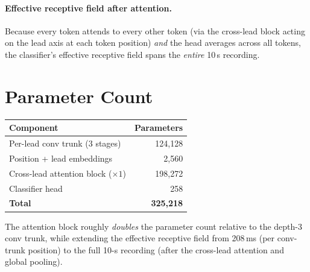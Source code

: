 \documentclass[11pt]{article}
\begin{document}
\paragraph{Effective receptive field after attention.}
Because every token attends to every other token (via the cross-lead block
acting on the lead axis at each token position) \emph{and} the head averages
across all tokens, the classifier's effective receptive field spans the
\emph{entire} 10\,s recording.

\section{Parameter Count}

\begin{center}
\begin{tabular}{lr}
\toprule
Component & Parameters \\
\midrule
Per-lead conv trunk (3 stages)              & 124{,}128 \\
Position + lead embeddings                  & 2{,}560 \\
Cross-lead attention block ($\times 1$)     & 198{,}272 \\
Classifier head                             & 258 \\
\midrule
\textbf{Total}                              & \textbf{325{,}218} \\
\bottomrule
\end{tabular}
\end{center}

The attention block roughly \emph{doubles} the parameter count relative to the
depth-3 conv trunk, while extending the effective receptive field from 208\,ms
(per conv-trunk position) to the full 10-s recording (after the cross-lead
attention and global pooling).
\end{document}
